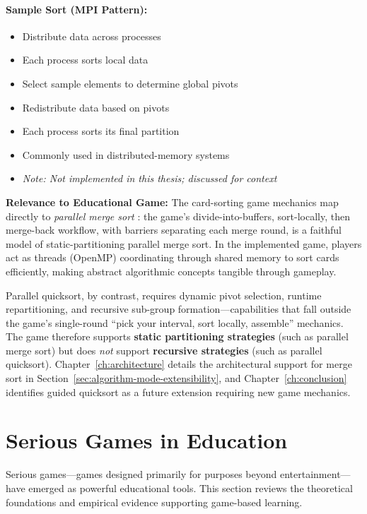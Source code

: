 \paragraph*{Sample Sort (MPI Pattern):}
\begin{itemize}
    \item Distribute data across processes
    \item Each process sorts local data
    \item Select sample elements to determine global pivots
    \item Redistribute data based on pivots
    \item Each process sorts its final partition
    \item Commonly used in distributed-memory systems
    \item \textit{Note: Not implemented in this thesis; discussed for context}
\end{itemize}

\textbf{Relevance to Educational Game:} The card-sorting game mechanics map directly to \emph{parallel merge sort} \citep{sanders2019sequential}: the game's divide-into-buffers, sort-locally, then merge-back workflow, with barriers separating each merge round, is a faithful model of static-partitioning parallel merge sort. In the implemented game, players act as threads (OpenMP) coordinating through shared memory to sort cards efficiently, making abstract algorithmic concepts tangible through gameplay.

Parallel quicksort, by contrast, requires dynamic pivot selection, runtime repartitioning, and recursive sub-group formation---capabilities that fall outside the game's single-round ``pick your interval, sort locally, assemble'' mechanics. The game therefore supports \textbf{static partitioning strategies} (such as parallel merge sort) but does \emph{not} support \textbf{recursive strategies} (such as parallel quicksort). Chapter~\ref{ch:architecture} details the architectural support for merge sort in Section~\ref{sec:algorithm-mode-extensibility}, and Chapter~\ref{ch:conclusion} identifies guided quicksort as a future extension requiring new game mechanics.

\section{Serious Games in Education}
\label{sec:serious-games}

Serious games—games designed primarily for purposes beyond entertainment—have emerged as powerful educational tools. This section reviews the theoretical foundations and empirical evidence supporting game-based learning.


